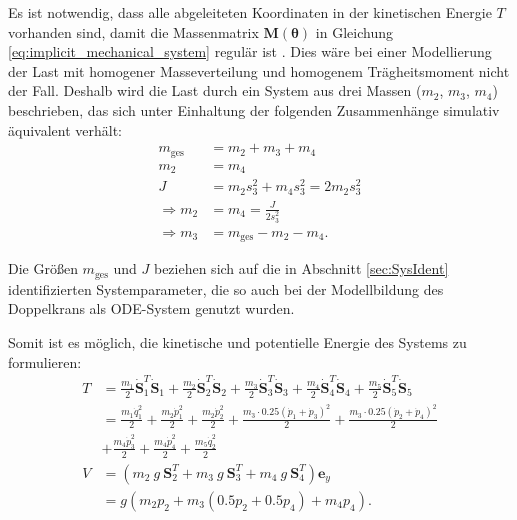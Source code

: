 Es ist notwendig, dass alle abgeleiteten Koordinaten in der kinetischen Energie $T$ vorhanden sind, damit die Massenmatrix $\mathbf{M}(\boldsymbol{\theta})$ in Gleichung \eqref{eq:implicit_mechanical_system} regulär ist \cite[${\text{S. 7}}$]{DissKnoll}. Dies wäre bei einer Modellierung der Last mit homogener Masseverteilung und homogenem Trägheitsmoment nicht der Fall. Deshalb wird die Last durch ein System aus drei Massen ($m_2$, $m_3$, $m_4$) beschrieben, das sich unter Einhaltung der folgenden Zusammenhänge simulativ äquivalent verhält:
\begin{align}
	m_{\mathrm{ges}} &= m_2 + m_3 + m_4\\
	m_2 &= m_4\\
	J &= m_2 s_3^2 + m_4 s_3^2 = 2 m_2 s_3^2\\
	\Rightarrow m_2 &= m_4 = \frac{J}{2 s_3^2} \\
	\Rightarrow m_3 &= m_{\mathrm{ges}} - m_2 -m_4.
\end{align}

Die Größen $m_{\mathrm{ges}}$ und $J$ beziehen sich auf die in Abschnitt \ref{sec:SysIdent} identifizierten Systemparameter, die so auch bei der Modellbildung des Doppelkrans als ODE-System genutzt wurden.

Somit ist es möglich, die kinetische und potentielle Energie des Systems zu formulieren:
\begin{align}
	T &= \frac{m_1}{2} \dot{\mathbf{S}}_1^T \dot{\mathbf{S}}_1 + \frac{m_2}{2} \dot{\mathbf{S}}_2^T \dot{\mathbf{S}}_2 + \frac{m_3}{2} \dot{\mathbf{S}}_3^T \dot{\mathbf{S}}_3 + \frac{m_4}{2} \dot{\mathbf{S}}_4^T \dot{\mathbf{S}}_4 + \frac{m_5}{2} \dot{\mathbf{S}}_5^T \dot{\mathbf{S}}_5 \nonumber \\  
	&= \frac{m_{1} \dot{q}_{1}^{2}}{2} + \frac{m_{2} \dot{p}_{1}^{2}}{2} + \frac{m_{2} \dot{p}_{2}^{2}}{2} + \frac{m_{3} \cdot 0.25 \left(\dot{p}_{1} + \dot{p}_{3}\right)^{2}}{2} + \frac{m_{3} \cdot 0.25 \left(\dot{p}_{2} + \dot{p}_{4}\right)^{2}}{2} \nonumber \\
	&+ \frac{m_{4} \dot{p}_{3}^{2}}{2} + \frac{m_{4} \dot{p}_{4}^{2}}{2} + \frac{m_{5} \dot{q}_{2}^{2}}{2} \\
	V &= (m_2 \ g \ \mathbf{S}_2^T + m_3 \ g \ \mathbf{S}_3^T + m_4 \ g \ \mathbf{S}_4^T) \mathbf{e}_y \nonumber \\ &= g \left(m_{2} p_{2} + m_{3} \left(0.5 p_{2} + 0.5 p_{4}\right) + m_{4} p_{4}\right).
\end{align}

